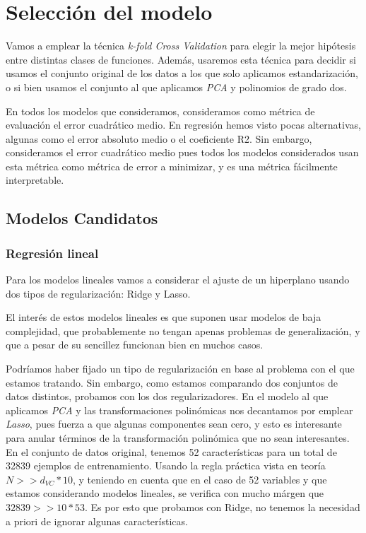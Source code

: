 \documentclass[11pt]{article}
\begin{document}
\pagebreak

\section{Selección del modelo} \label{seleccion_modelos}

Vamos a emplear la técnica \emph{k-fold Cross Validation} para elegir la mejor hipótesis entre distintas clases de funciones. Además, usaremos esta técnica para decidir si usamos el conjunto original de los datos a los que solo aplicamos estandarización, o si bien usamos el conjunto al que aplicamos \emph{PCA} y polinomios de grado dos.

En todos los modelos que consideramos, consideramos como métrica de evaluación el error cuadrático medio. En regresión hemos visto pocas alternativas, algunas como el error absoluto medio o el coeficiente R2. Sin embargo, consideramos el error cuadrático medio pues todos los modelos considerados usan esta métrica como métrica de error a minimizar, y es una métrica fácilmente interpretable.

\subsection{Modelos Candidatos}

\subsubsection{Regresión lineal} \label{regresion_lineal}

Para los modelos lineales vamos a considerar el ajuste de un hiperplano usando dos tipos de regularización: Ridge y Lasso.

El interés de estos modelos lineales es que suponen usar modelos de baja complejidad, que probablemente no tengan apenas problemas de generalización, y que a pesar de su sencillez funcionan bien en muchos casos.

Podríamos haber fijado un tipo de regularización en base al problema con el que estamos tratando. Sin embargo, como estamos comparando dos conjuntos de datos distintos, probamos con los dos regularizadores. En el modelo al que aplicamos \emph{PCA} y las transformaciones polinómicas nos decantamos por emplear \emph{Lasso}, pues fuerza a que algunas componentes sean cero, y esto es interesante para anular términos de la transformación polinómica que no sean interesantes. En el conjunto de datos original, tenemos 52 características para un total de 32839 ejemplos de entrenamiento. Usando la regla práctica vista en teoría $N >> d_{VC} * 10$, y teniendo en cuenta que en el caso de 52 variables y que estamos considerando modelos lineales, se verifica con mucho márgen que $32839 >> 10 * 53$. Es por esto que probamos con Ridge, no tenemos la necesidad a priori de ignorar algunas características.
\end{document}
